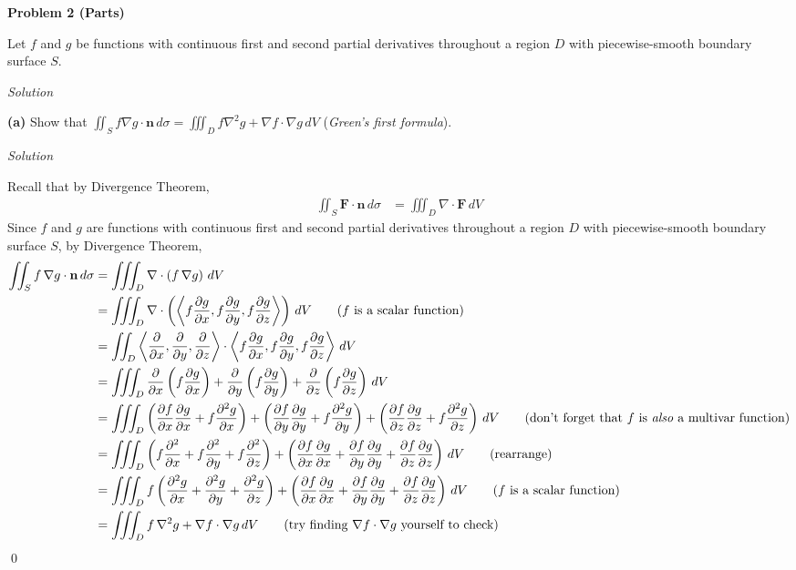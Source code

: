 \documentclass{article}
\newcommand{\lrp}[1]{\left( #1 \right)}
\newcommand{\lra}[1]{\left\langle #1 \right\rangle}
\newcommand{\F}[0]{\mathbf{F}}
\newcommand{\n}[0]{\mathbf{n}}
\newcommand{\Solution}{\textit{Solution}}
\begin{document}
{}\textbf{Problem 2 (Parts)}

Let $f$ and $g$ be functions with continuous first and second partial derivatives throughout a region $D$ with piecewise-smooth boundary surface $S$.

\Solution


{}\textbf{(a)} Show that $\displaystyle \iint_S f\nabla g\cdot \n\,d\sigma=\iiint_D f\nabla^2 g + \nabla f \cdot \nabla g \,dV$ (\textit{Green's first formula}).

\Solution

Recall that by Divergence Theorem,
\begin{align*}
   \iint_S \F\cdot \n \,d\sigma&= \iiint_D \nabla \cdot \F\,dV
\end{align*}
Since $f$ and $g$ are functions with continuous first and second partial derivatives throughout a region $D$ with piecewise-smooth boundary surface $S$, by Divergence Theorem,
\begin{align*}
    \iint_S f\,\nabla g\cdot \n\,d\sigma &= \iiint_D \nabla \cdot\lrp{f\,\nabla g}\,dV\\
    &=\iiint_D \nabla \cdot\lrp{\lra{f\frac{\partial g}{\partial x},f\frac{\partial g}{\partial y},f\frac{\partial g}{\partial z}}}\,dV\tag{$f$ is a scalar function}\\
    &=\iint_D \lra{\frac{\partial }{\partial x}, \frac{\partial }{\partial y}, \frac{\partial }{\partial z}}\cdot \lra{f\frac{\partial g}{\partial x},f\frac{\partial g}{\partial y},f\frac{\partial g}{\partial z}}\,dV\\
    &=\iiint_D \frac{\partial }{\partial x}\lrp{f\frac{\partial g}{\partial x}}+\frac{\partial }{\partial y}\lrp{f\frac{\partial g}{\partial y}}+\frac{\partial }{\partial z}\lrp{f\frac{\partial g}{\partial z}}\,dV\\
    &=\iiint_D \lrp{\frac{\partial f}{\partial x}\frac{\partial g}{\partial x}+f\frac{\partial ^2 g}{\partial x}}+\lrp{\frac{\partial f}{\partial y}\frac{\partial g}{\partial y}+f\frac{\partial ^2 g}{\partial y}}+\lrp{\frac{\partial f}{\partial z}\frac{\partial g}{\partial z}+f\frac{\partial ^2 g}{\partial z}}\,dV\tag{don't forget that $f$ is \textit{also} a multivar function}\\
    &=\iiint_D \lrp{f\frac{\partial^2}{\partial x}+f\frac{\partial^2}{\partial y}+f\frac{\partial^2}{\partial z}}+\lrp{\frac{\partial f}{\partial x}\frac{\partial g}{\partial x}+\frac{\partial f}{\partial y}\frac{\partial g}{\partial y}+\frac{\partial f}{\partial z}\frac{\partial g}{\partial z}}\,dV\tag{rearrange}\\
    &=\iiint_D f\lrp{\frac{\partial^2 g}{\partial x}+\frac{\partial^2 g}{\partial y}+\frac{\partial^2 g}{\partial z}}+\lrp{\frac{\partial f}{\partial x}\frac{\partial g}{\partial x}+\frac{\partial f}{\partial y}\frac{\partial g}{\partial y}+\frac{\partial f}{\partial z}\frac{\partial g}{\partial z}}\,dV\tag{$f$ is a scalar function}\\
    &=\iiint_D f\,\nabla^2 g + \nabla f\cdot\nabla g\,dV\tag{try finding $\nabla f\cdot \nabla g$ yourself to check}
\end{align*}
\qed
\end{document}
